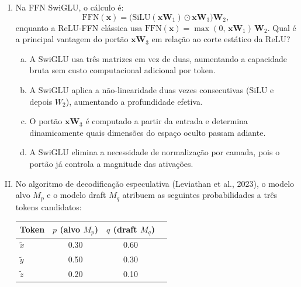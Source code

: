 \documentclass{dlproblemset}
\begin{document}
\begin{enumerate}[I)]
\item Na FFN SwiGLU, o cálculo é:
      \[
        \mathrm{FFN}(\mathbf{x}) = \bigl(\mathrm{SiLU}(\mathbf{x}\mathbf{W}_1) \odot \mathbf{x}\mathbf{W}_3\bigr)\mathbf{W}_2,
      \]
      enquanto a ReLU-FFN clássica usa $\mathrm{FFN}(\mathbf{x}) = \max(0,\,\mathbf{x}\mathbf{W}_1)\,\mathbf{W}_2$.
      Qual é a principal vantagem do portão $\mathbf{x}\mathbf{W}_3$ em relação ao corte
      estático da ReLU?

\begin{enumerate}[a)]
    \item A SwiGLU usa três matrizes em vez de duas, aumentando a capacidade
          bruta sem custo computacional adicional por token.
    \item A SwiGLU aplica a não-linearidade duas vezes consecutivas
          ($\mathrm{SiLU}$ e depois $W_2$), aumentando a profundidade efetiva.
    \item O portão $\mathbf{x}\mathbf{W}_3$ é computado a partir da entrada e determina
          dinamicamente quais dimensões do espaço oculto passam adiante.
    \item A SwiGLU elimina a necessidade de normalização por camada, pois
          o portão já controla a magnitude das ativações.
\end{enumerate}

\item {} No algoritmo de decodificação especulativa
      (Leviathan et al., 2023), o modelo alvo $M_p$ e o modelo draft $M_q$
      atribuem as seguintes probabilidades a três tokens candidatos:

\begin{center}
\begin{tabular}{lccc}
  \toprule
  Token & $p$ (alvo $M_p$) & $q$ (draft $M_q$) \\
  \midrule
  $\tilde{x}$ & 0.30 & 0.60 \\
  $\tilde{y}$ & 0.50 & 0.30 \\
  $\tilde{z}$ & 0.20 & 0.10 \\
  \bottomrule
\end{tabular}
\end{center}


\end{enumerate}
\end{document}
